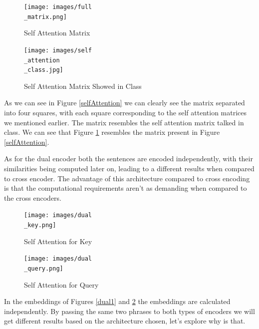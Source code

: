 \documentclass[runningheads]{llncs}
\begin{document}
\begin{figure}[htbp]
    \centering
    \begin{minipage}{0.50\textwidth}
        \centering
        \texttt{[image: images/full\\\_matrix.png]}
        \caption{Self Attention Matrix}
        \label{selfAttention}
    \end{minipage}\hfill
    \begin{minipage}{0.4\textwidth}
        \centering
        \texttt{[image: images/self\\\_attention\\\_class.jpg]}
        \caption{Self Attention Matrix Showed in Class}
         \label{selfAttentionClass}
    \end{minipage}
\end{figure}

As we can see in Figure \ref{selfAttention} we can clearly see the matrix separated into four squares, with each square corresponding to the self attention matrices we mentioned earlier. The matrix resembles the self attention matrix talked in class. We can see that Figure \ref{selfAttentionClass} resembles the matrix present in Figure \ref{selfAttention}.

As for the dual encoder both the sentences are encoded independently, with their similarities being computed later on, leading to a different results when compared to cross encoder. The advantage of this architecture compared to cross encoding is that the computational requirements aren't as demanding when compared to the cross encoders. 

\begin{figure}[htbp]
    \centering
    \begin{minipage}{0.50\textwidth}
        \centering
        \texttt{[image: images/dual\\\_key.png]}
        \caption{Self Attention for Key}
         \label{dual1}
    \end{minipage}\hfill
    \begin{minipage}{0.50\textwidth}
        \centering
        \texttt{[image: images/dual\\\_query.png]}
        \caption{Self Attention for Query}
         \label{dual2}
    \end{minipage}
\end{figure}

In the embeddings of Figures \ref{dual1} and \ref{dual2} the embeddings are calculated independently.
By passing the same two phrases to both types of encoders we will get different results based on the architecture chosen, let's explore why is that.\\[5pt]
\end{document}
